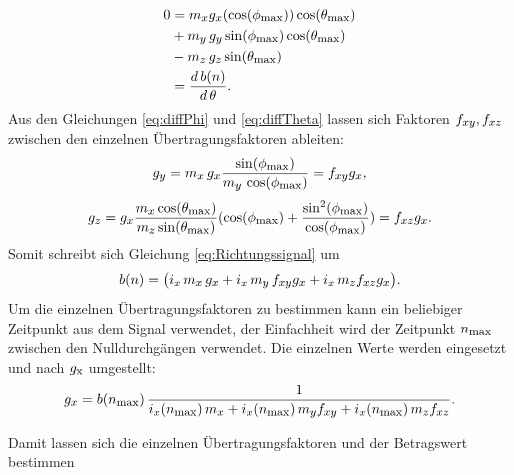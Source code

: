 \begin{equation}
    \begin{split}
    0 &=   m_{\textrm{\footnotesize{$x$}}}g_{\textrm{\footnotesize{$x$}}} (\cos(\phi_{\textrm{\footnotesize{max}}} )) \cos(\theta_{\textrm{\footnotesize{max}}} ) \\  &+m_{\textrm{\footnotesize{$y$}}}\,g_{\textrm{\footnotesize{$y$}}} \sin(\phi_{\textrm{\footnotesize{max}}})\cos(\theta_{\textrm{\footnotesize{max}}}) \\ &- m_{\textrm{\footnotesize{$z$}}}\,g_{\textrm{\footnotesize{$z$}}}\sin(\theta_{\textrm{\footnotesize{max}}} )\\ &= \frac{d\,b(n)}{d\, \theta }.
    \label{eq:diffTheta}
    \end{split}
\end{equation}
Aus den Gleichungen \ref{eq:diffPhi} und \ref{eq:diffTheta} lassen sich Faktoren $f_{\textrm{\footnotesize{$xy$}}},f_{\textrm{\footnotesize{$xz$}}}$ zwischen den einzelnen Übertragungsfaktoren ableiten:
\begin{equation}
    g_{\textrm{\footnotesize{$y$}}} = m_{\textrm{\footnotesize{$x$}}}\,g_{\textrm{\footnotesize{$x$}}} \frac{\sin(\phi_{\textrm{\footnotesize{max}}})}{m_{\textrm{\footnotesize{$y$}}}\,\cos(\phi_{\textrm{\footnotesize{max}}})} = f_{\textrm{\footnotesize{$xy$}}} g_{\textrm{\footnotesize{$x$}}},
    \label{eq:FaktorYX}
\end{equation}
\begin{equation}
    g_{\textrm{\footnotesize{$z$}}} = g_{\textrm{\footnotesize{$x$}}} \frac{m_{\textrm{\footnotesize{$x$}}}\cos(\theta_{\textrm{\footnotesize{max}}})}{m_{\textrm{\footnotesize{$z$}}}\sin(\theta_{\textrm{\footnotesize{max}}})} (\cos(\phi_{\textrm{\footnotesize{max}}})+\frac{\sin^2(\phi_{\textrm{\footnotesize{max}}})}{\cos(\phi_{\textrm{\footnotesize{max}}})}) = f_{\textrm{\footnotesize{$xz$}}}g_{\textrm{\footnotesize{$x$}}}.
    \label{eq:FaktorXZ}
\end{equation}
Somit schreibt sich Gleichung \ref{eq:Richtungssignal} um 
\begin{equation}
    b(n) =  \bigl( i_x\,m_{\textrm{\footnotesize{$x$}}}\,g_{\textrm{\footnotesize{$x$}}} + i_x\,m_{\textrm{\footnotesize{$y$}}}\,f_{\textrm{\footnotesize{$xy$}}}g_{\textrm{\footnotesize{$x$}}} + i_x\,m_{\textrm{\footnotesize{$z$}}}f_{\textrm{\footnotesize{$xz$}}}g_{\textrm{\footnotesize{$x$}}} \bigr).
\end{equation}
Um die einzelnen Übertragungsfaktoren zu bestimmen kann ein beliebiger Zeitpunkt aus dem Signal verwendet, der Einfachheit wird der Zeitpunkt $n_{\textrm{\footnotesize{max}}}$ zwischen den Nulldurchgängen verwendet. Die einzelnen Werte werden eingesetzt und nach $g_{\textrm{\footnotesize{x}}}$ umgestellt:
\begin{equation}
    \begin{split}
        g_{\textrm{\footnotesize{$x$}}} = b(n_{\textrm{\footnotesize{max}}})\,\frac{1}{i_x(n_{\textrm{\footnotesize{max}}})\,m_{\textrm{\footnotesize{$x$}}}+i_x(n_{\textrm{\footnotesize{max}}})\,m_{\textrm{\footnotesize{$y$}}}f_{\textrm{\footnotesize{$xy$}}}+i_x(n_{\textrm{\footnotesize{max}}})\,m_{\textrm{\footnotesize{$z$}}}f_{\textrm{\footnotesize{$xz$}}}} . 
    \end{split}
\end{equation}

Damit lassen sich die einzelnen Übertragungsfaktoren und der Betragswert bestimmen

